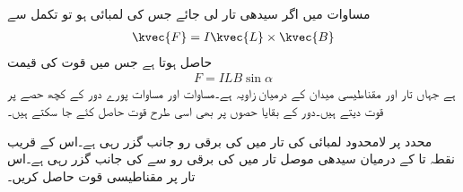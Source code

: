 مساوات  میں اگر سیدھی تار لی جائے جس کی لمبائی  ہو  تو تکمل سے
\begin{align}\label{مساوات_امالہ_سیدھی_تار_قوت_الف}
\kvec{F}=I \kvec{L} \times \kvec{B}
\end{align}
حاصل ہوتا ہے جس میں قوت کی قیمت
\begin{align}\label{مساوات_امالہ_سیدھی_تار_قوت_ب}
F=I L B \sin \alpha
\end{align}
ہے جہاں تار اور مقناطیسی میدان کے درمیان زاویہ  ہے۔مساوات  اور مساوات  پورے دور کے کچھ حصے پر قوت دیتے ہیں۔دور کے بقایا حصوں پر بھی اسی طرح قوت حاصل کئے جا سکتے ہیں۔

محدد  پر لامحدود لمبائی کی تار میں  کی برقی رو  جانب گزر رہی ہے۔اس کے قریب نقطہ  تا
  کے درمیان سیدھی موصل تار میں  کی برقی رو  سے  کی جانب گزر رہی ہے۔اس تار پر مقناطیسی قوت حاصل کریں۔


